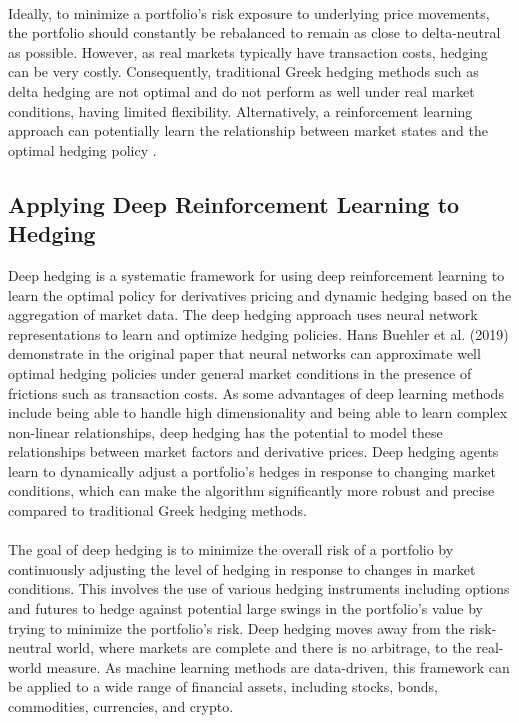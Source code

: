 \\
Ideally, to minimize a portfolio's risk exposure to underlying price movements, the portfolio should constantly be rebalanced to remain as close to delta-neutral as possible. However, as real markets typically have transaction costs, hedging can be very costly. Consequently, traditional Greek hedging methods such as delta hedging are not optimal and do not perform as well under real market conditions, having limited flexibility. Alternatively, a reinforcement learning approach can potentially learn the relationship between market states and the optimal hedging policy \cite{toronto-deep-hedging}.

\subsection{Applying Deep Reinforcement Learning to Hedging}
Deep hedging is a systematic framework for using deep reinforcement learning to learn the optimal policy for derivatives pricing and dynamic hedging based on the aggregation of market data. The deep hedging approach uses neural network representations to learn and optimize hedging policies. Hans Buehler et al. (2019) demonstrate in the original paper that neural networks can approximate well optimal hedging policies under general market conditions in the presence of frictions such as transaction costs. As some advantages of deep learning methods include being able to handle high dimensionality and being able to learn complex non-linear relationships, deep hedging has the potential to model these relationships between market factors and derivative prices. Deep hedging agents learn to dynamically adjust a portfolio's hedges in response to changing market conditions, which can make the algorithm significantly more robust and precise compared to traditional Greek hedging methods.
\\ \\
The goal of deep hedging is to minimize the overall risk of a portfolio by continuously adjusting the level of hedging in response to changes in market conditions. This involves the use of various hedging instruments including options and futures to hedge against potential large swings in the portfolio's value by trying to minimize the portfolio's risk. Deep hedging moves away from the risk-neutral world, where markets are complete and there is no arbitrage, to the real-world measure. As machine learning methods are data-driven, this framework can be applied to a wide range of financial assets, including stocks, bonds, commodities, currencies, and crypto.

